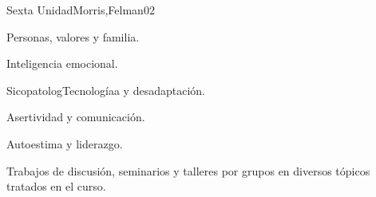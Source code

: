 \begin{syllabus}
\begin{unit}{Sexta Unidad}{Morris,Felman}{0}{2}
\begin{topics}
	\item Personas, valores y familia.
	\item Inteligencia emocional.
	\item SicopatologTecnologíaa y desadaptación.
	\item Asertividad y comunicación.
	\item Autoestima y liderazgo.
\end{topics}
\begin{learningoutcomes}
	\item Trabajos de discusión, seminarios y talleres por grupos en diversos tópicos tratados en el curso.
\end{learningoutcomes}
\end{unit}



\begin{coursebibliography}
\end{coursebibliography}

\end{syllabus}
